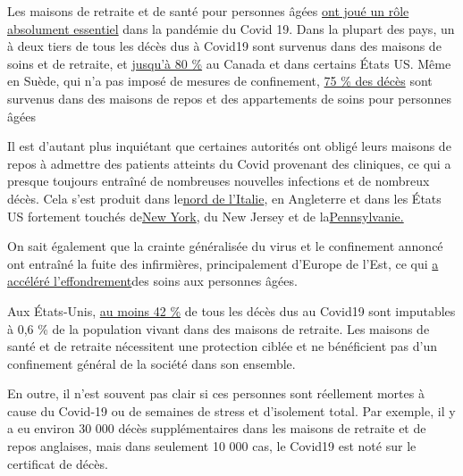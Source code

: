 Les maisons de retraite et de santé pour personnes âgées
\href{https://ltccovid.org/2020/04/12/mortality-associated-with-covid-19-outbreaks-in-care-homes-early-international-evidence/}{ont
joué un rôle absolument essentiel} dans la pandémie du Covid 19. Dans la
plupart des pays, un à deux tiers de tous les décès dus à Covid19 sont
survenus dans des maisons de soins et de retraite, et
\href{https://freopp.org/the-covid-19-nursing-home-crisis-by-the-numbers-3a47433c3f70}{jusqu'à
80 \%} au Canada et dans certains États US. Même en Suède, qui n'a pas
imposé de mesures de confinement,
\href{https://www.thelocal.se/20200525/swedish-death-toll-passes-4000-as-coronavirus-cases-in-care-homes-start-to-fall}{75
\% des décès} sont survenus dans des maisons de repos et des
appartements de soins pour personnes âgées

Il est d'autant plus inquiétant que certaines autorités ont obligé leurs
maisons de repos à admettre des patients atteints du Covid provenant des
cliniques, ce qui a presque toujours entraîné de nombreuses nouvelles
infections et de nombreux décès. Cela s'est produit dans
le\href{https://www.trtworld.com/magazine/the-massacre-of-italy-s-elderly-nursing-home-residents-35575}{nord
de l'Italie}, en Angleterre et dans les États US fortement touchés
de\href{https://nypost.com/2020/05/12/calls-for-independent-probe-of-gov-cuomos-nursing-home-policies/}{New
York}, du New Jersey et de
la\href{https://nypost.com/2020/05/13/pennsylvania-health-official-moved-mother-from-nursing-home/}{Pennsylvanie.}

On sait également que la crainte généralisée du virus et le confinement
annoncé ont entraîné la fuite des infirmières, principalement d'Europe
de l'Est, ce qui
\href{https://swprs.org/covid-19-a-report-from-italy/}{a accéléré
l'effondrement}des soins aux personnes âgées.

Aux États-Unis,
\href{https://www.forbes.com/sites/theapothecary/2020/05/26/nursing-homes-assisted-living-facilities-0-6-of-the-u-s-population-43-of-u-s-covid-19-deaths/}{au
moins 42 \%} de tous les décès dus au Covid19 sont imputables à 0,6 \%
de la population vivant dans des maisons de retraite. Les maisons de
santé et de retraite nécessitent une protection ciblée et ne bénéficient
pas d'un confinement général de la société dans son ensemble.

En outre, il n'est souvent pas clair si ces personnes sont réellement
mortes à cause du Covid-19 ou de semaines de stress et d'isolement
total. Par exemple, il y a eu environ 30 000 décès supplémentaires dans
les maisons de retraite et de repos anglaises, mais dans seulement 10
000 cas, le Covid19 est noté sur le certificat de décès.

